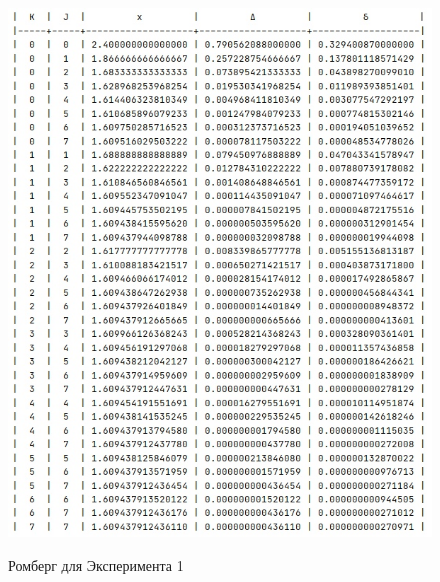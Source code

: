 \documentclass[14pt, titlepage, a4paper]{extarticle} %
\begin{document}
	\begin{figure}[h]
		\centering
		\includegraphics[width=500pt]{r1.jpeg}
		\label{fig:rm1}
		\caption{Ромберг для Эксперимента 1}
	\end{figure}
	
\end{document}
